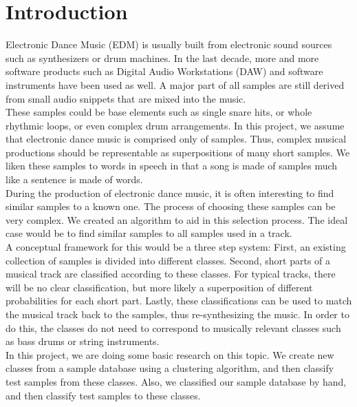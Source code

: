 \section{Introduction}
\label{sec:Introduction}
Electronic Dance Music (EDM) is usually built from electronic sound sources such as synthesizers or drum machines. In the last decade, more and more software products such as Digital Audio Workstations (DAW) and software instruments have been used as well. A major part of all samples are still derived from small audio snippets that are mixed into the music.\\
These samples could be base elements such as single snare hits, or whole rhythmic loops, or even complex drum arrangements. In this project, we assume that electronic dance music is comprised only of samples. Thus, complex musical productions should be representable as superpositions of many short samples. We liken these samples to words in speech in that a song is made of samples much like a sentence is made of words.\\
During the production of electronic dance music, it is often interesting to find similar samples to a known one. The process of choosing these samples can be very complex. We created an algorithm to aid in this selection process. The ideal case would be to find similar samples to all samples used in a track. \\
A conceptual framework for this would be a three step system: First, an existing collection of samples is divided into different classes. Second, short parts of a musical track are classified according to these classes. For typical tracks, there will be no clear classification, but more likely a superposition of different probabilities for each short part. Lastly, these classifications can be used to match the musical track back to the samples, thus re-synthesizing the music. In order to do this, the classes do not need to correspond to musically relevant classes such as bass drums or string instruments.\\
In this project, we are doing some basic research on this topic. We create new classes from a sample database using a clustering algorithm, and then classify test samples from these classes. Also, we classified our sample database by hand, and then classify test samples to these classes.
